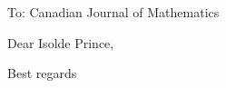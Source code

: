 \documentclass[fontsize=10pt, paper=a4]{scrlttr2}
\begin{document}
\begin{letter}{To: Canadian Journal of Mathematics}

\opening{Dear Isolde Prince,}  %




\closing{Best regards} %

\end{letter}
\end{document}
